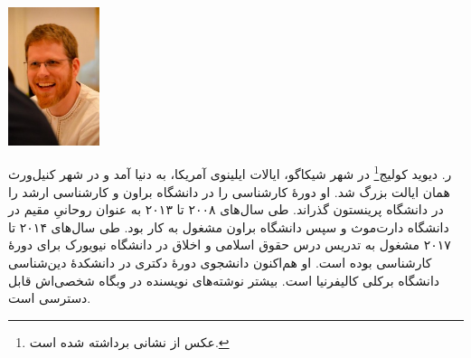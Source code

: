 \begin{center}
	\includegraphics[width=0.2\textwidth]{david}	
\end{center}


ر. دیوید کولیج\footnote{
	عکس از نشانی  برداشته شده است.
}
در شهر شیکاگو، ایالات ایلینوی آمریکا، به دنیا آمد و در شهر کنیل‌ورث همان ایالت بزرگ شد. او دورهٔ کارشناسی را در دانشگاه براون و کارشناسی ارشد را در دانشگاه پرینستون گذراند. طی سال‌های ۲۰۰۸ تا ۲۰۱۳ به عنوان روحانیِ مقیم در دانشگاه دارت‌موث و سپس دانشگاه براون مشغول به کار بود. طی سال‌های ۲۰۱۴ تا ۲۰۱۷ مشغول به تدریس درس حقوق اسلامی و اخلاق در دانشگاه نیویورک برای دورهٔ کارشناسی بوده است. او هم‌اکنون دانشجوی دورهٔ دکتری در دانشکدهٔ دین‌شناسی دانشگاه برکلی کالیفرنیا است. بیشتر نوشته‌های نویسنده در وبگاه شخصی‌اش {\tiny {}} قابل دسترسی است.







